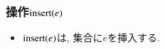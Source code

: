 \documentclass[main]{subfiles}
\begin{document}
\begin{frame}\frametitle{操作$\mathrm{insert}(e)$}
\begin{itemize}
	\item $\mathrm{insert}(e)$は, 集合に$e$を挿入する.\\
\end{itemize}

\begin{columns}[c]
	\begin{column}{0.5\linewidth}
		
	\end{column}
	\begin{column}{0.49\linewidth}
		
	\end{column}
\end{columns}
\end{frame}
\end{document}
